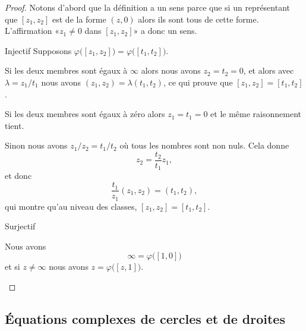 \begin{proof}
    Notons d'abord que la définition a un sens parce que si un représentant que \( [z_1,z_2]\) est de la forme \( (z,0)\) alors ils sont tous de cette forme. L'affirmation «\( z_1\neq 0\) dans \( [z_1,z_2]\)» a donc un sens.
    \begin{subproof}
        \item[Injectif]
            Supposons \( \varphi\big( [z_1,z_2] \big)=\varphi\big( [t_1,t_2] \big)\). 
            
            Si les deux membres sont égaux à \( \infty\) alors nous avons \( z_2=t_2=0\), et alors avec \( \lambda=z_1/t_1\) nous avons \( (z_1,z_2)=\lambda (t_1,t_2)\), ce qui prouve que \( [z_1,z_2]=[t_1,t_2]\).

            Si les deux membres sont égaux à zéro alors \( z_1=t_1=0\) et le même raisonnement tient.

            Sinon nous avons \( z_1/z_2=t_1/t_2\) où tous les nombres sont non nuls. Cela donne 
            \begin{equation}
                z_2=\frac{ t_2 }{ t_1 }z_1,
            \end{equation}
            et donc
            \begin{equation}
                \frac{ t_1 }{ z_1 }(z_1,z_2)=(t_1,t_2),
            \end{equation}
            qui montre qu'au niveau des classes, \( [z_1,z_2]=[t_1,t_2]\).

        \item[Surjectif]

            Nous avons
            \begin{equation}
                \infty=\varphi\big( [1,0] \big)
            \end{equation}
            et si \( z\neq \infty\) nous avons \( z=\varphi\big( [z,1] \big)\).
    \end{subproof}
\end{proof}

\subsection{Équations complexes de cercles et de droites}

